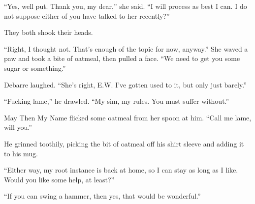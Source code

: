 ``Yes, well put. Thank you, my dear,'' she said. ``I will process as best I can. I do not suppose either of you have talked to her recently?''

They both shook their heads.

``Right, I thought not. That's enough of the topic for now, anyway.'' She waved a paw and took a bite of oatmeal, then pulled a face. ``We need to get you some sugar or something.''

Debarre laughed. ``She's right, E.W. I've gotten used to it, but only just barely.''

``Fucking lame,'' he drawled. ``My sim, my rules. You must suffer without.''

May Then My Name flicked some oatmeal from her spoon at him. ``Call me lame, will you.''

He grinned toothily, picking the bit of oatmeal off his shirt sleeve and adding it to his mug.

``Either way, my root instance is back at home, so I can stay as long as I like. Would you like some help, at least?''

``If you can swing a hammer, then yes, that would be wonderful.''
